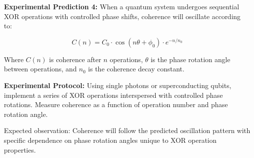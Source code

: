 \textbf{Experimental Prediction 4:} When a quantum system undergoes sequential XOR operations with controlled phase shifts, coherence will oscillate according to:

\begin{equation}
C(n) = C_0 \cdot \cos(n\theta + \phi_0) \cdot e^{-n/n_0}
\end{equation}

Where $C(n)$ is coherence after $n$ operations, $\theta$ is the phase rotation angle between operations, and $n_0$ is the coherence decay constant.

\textbf{Experimental Protocol:} Using single photons or superconducting qubits, implement a series of XOR operations interspersed with controlled phase rotations. Measure coherence as a function of operation number and phase rotation angle.

Expected observation: Coherence will follow the predicted oscillation pattern with specific dependence on phase rotation angles unique to XOR operation properties. 
